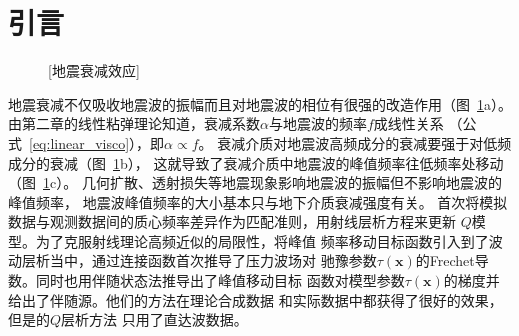\section{引言}
\vspace{0.5cm}
\begin{figure}[!htbp]
    \centering
    [地震衰减效应]
    \label{fig:q_effect}
\end{figure}
地震衰减不仅吸收地震波的振幅而且对地震波的相位有很强的改造作用（图~\ref{fig:q_effect}a）。
由第二章的线性粘弹理论知道，衰减系数$\alpha$与地震波的频率$f$成线性关系
（公式~\ref{eq:linear_visco}），即$\alpha\propto f$。
衰减介质对地震波高频成分的衰减要强于对低频成分的衰减（图~\ref{fig:q_effect}b），
这就导致了衰减介质中地震波的峰值频率往低频率处移动（图~\ref{fig:q_effect}c）。
几何扩散、透射损失等地震现象影响地震波的振幅但不影响地震波的峰值频率，
地震波峰值频率的大小基本只与地下介质衰减强度有关。
首次将模拟数据与观测数据间的质心频率差异作为匹配准则，用射线层析方程来更新
$Q$模型。为了克服射线理论高频近似的局限性，将峰值
频率移动目标函数引入到了波动层析当中，通过连接函数首次推导了压力波场对
驰豫参数$\tau(\mathbf{x})$的Frechet导数。同时也用伴随状态法推导出了峰值移动目标
函数对模型参数$\tau(\mathbf{x})$的梯度并给出了伴随源。他们的方法在理论合成数据
和实际数据中都获得了很好的效果，但是的$Q$层析方法
只用了直达波数据。

